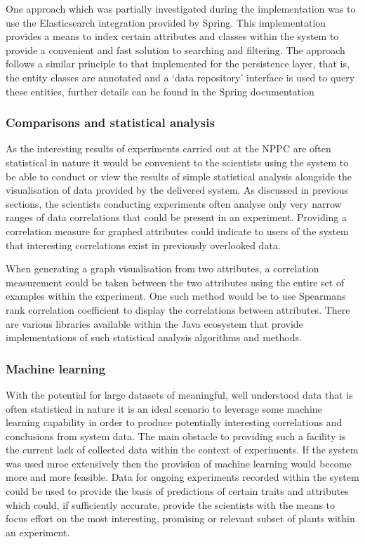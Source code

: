 One approach which was partially investigated during the implementation was to use the Elasticsearch\cite{elastic} integration provided by Spring. This implementation provides a means to index certain attributes and classes within the system to provide a convenient and fast solution to searching and filtering. The approach follows a similar principle to that implemented for the persistence layer, that is, the entity classes are annotated and a `data repository' interface is used to query these entities, further details can be found in the Spring documentation\cite{_spelastic}  


\subsubsection{Comparisons and statistical analysis}
As the interesting results of experiments carried out at the NPPC are often statistical in nature it would be convenient to the scientists using the system to be able to conduct or view the results of simple statistical analysis alongside the visualisation of data provided by the delivered system. As discussed in previous sections, the scientists conducting experiments often analyse only very narrow ranges of data correlations that could be present in an experiment. Providing a correlation measure for graphed attributes could indicate to users of the system that interesting correlations exist in previously overlooked data. 

When generating a graph visualisation from two attributes, a correlation measurement could be taken between the two attributes using the entire set of examples within the experiment. One such method would be to use Spearmans rank correlation coefficient\cite{spearman} to display the correlations between attributes. There are various libraries available within the Java ecosystem that provide implementations of such statistical analysis algorithms and methods. 

\subsubsection{Machine learning}
With the potential for large datasets of meaningful, well understood data that is often statistical in nature it is an ideal scenario to leverage some machine learning capability in order to produce potentially interesting correlations and conclusions from system data. The main obstacle to providing such a facility is the current lack of collected data within the context of experiments. If the system was used mroe extensively then the provision of machine learning would become more and more feasible. Data for ongoing experiments recorded within the system could be used to provide the basis of predictions of certain traits and attributes which could, if sufficiently accurate, provide the scientists with the means to focus effort on the most interesting, promising or relevant subset of plants within an experiment.



